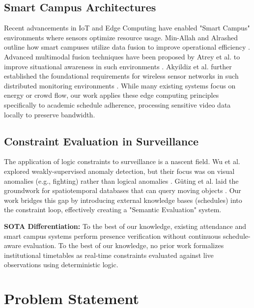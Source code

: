 \documentclass[conference]{IEEEtran}
\begin{document}
\subsection{Smart Campus Architectures}
Recent advancements in IoT and Edge Computing have enabled "Smart Campus" environments where sensors optimize resource usage. Min-Allah and Alrashed outline how smart campuses utilize data fusion to improve operational efficiency \cite{b1}. Advanced multimodal fusion techniques have been proposed by Atrey et al. to improve situational awareness in such environments \cite{b6}. Akyildiz et al. further established the foundational requirements for wireless sensor networks in such distributed monitoring environments \cite{b25}. While many existing systems focus on energy or crowd flow, our work applies these edge computing principles specifically to academic schedule adherence, processing sensitive video data locally to preserve bandwidth.

\subsection{Constraint Evaluation in Surveillance}
The application of logic constraints to surveillance is a nascent field. Wu et al. explored weakly-supervised anomaly detection, but their focus was on visual anomalies (e.g., fighting) rather than logical anomalies \cite{b14}. Güting et al. laid the groundwork for spatiotemporal databases that can query moving objects \cite{b23}. Our work bridges this gap by introducing external knowledge bases (schedules) into the constraint loop, effectively creating a "Semantic Evaluation" system.

\textbf{SOTA Differentiation:} To the best of our knowledge, existing attendance and smart campus systems perform presence verification without continuous schedule-aware evaluation. To the best of our knowledge, no prior work formalizes institutional timetables as real-time constraints evaluated against live observations using deterministic logic.

\section{Problem Statement}
\end{document}
